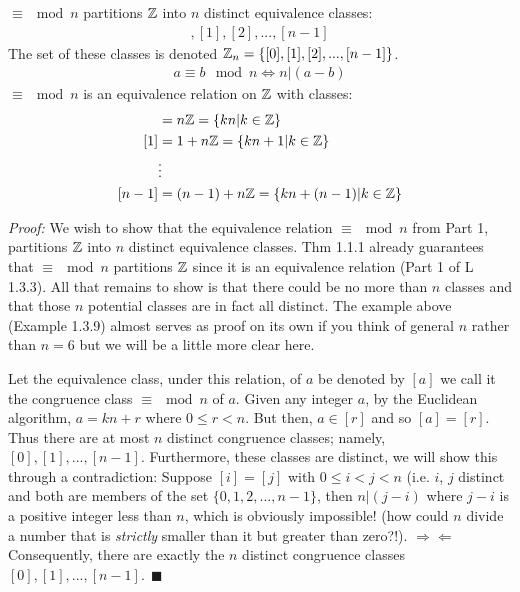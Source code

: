 \newpage
\setcounter{dummy_lemma}{2}
\begin{lemma}[Part 2]
$\equiv \mod n$ partitions ${\mathbb{Z}}$ into $n$ distinct equivalence classes:
\begin{align}
    [0],[1],[2],...,[n-1]\nonumber
\end{align}
The set of these classes is denoted ${\mathbb{Z}}_n=\{[0],[1],[2],...,[n-1]\}$.
\begin{align}
    a\equiv b\mod n \iff n|(a-b) \nonumber
\end{align}
$\equiv \mod n$ is an equivalence relation on ${\mathbb{Z}}$ with classes:
\begin{align}
    [0]&= n\Z=\{kn|k\in \Z\} \nonumber\\
    [1]&= 1+n\Z=\{kn+1|k\in \Z\} \nonumber\\
    &\vdots \nonumber \\
    [n-1]&= (n-1)+n\Z = \{kn+(n-1)|k\in \Z \} \nonumber
\end{align}

\textit{Proof:} We wish to show that the equivalence relation $\equiv\mod n$ from Part 1, partitions
${\mathbb{Z}}$ into $n$ distinct equivalence classes. Thm 1.1.1 already guarantees that $\equiv\mod n$
partitions ${\mathbb{Z}}$ since it is an equivalence relation (Part 1 of L 1.3.3). All that remains to show is
that there could be no more than $n$ classes and that those $n$ potential classes are in fact all
distinct. The example above (Example 1.3.9) almost serves as proof on its own if you think of
general $n$ rather than $n=6$ but we will be a little more clear here. \steezybreak

\noindent Let the equivalence class, under this relation, of $a$ be denoted by $[a]$
we call it the congruence class $\equiv\mod n$ of $a$. Given any integer $a$, by the
Euclidean algorithm, $a = kn + r$ where $0 \leq r < n$. But then, $a \in [r]$ and
so $[a] = [r]$. Thus there are at most $n$ distinct congruence classes; namely,
$[0], [1], ... , [n- 1]$. Furthermore, these classes are distinct, we will show this through a
contradiction: Suppose $[i] = [j]$ with $0 \leq i < j < n$ (i.e. $i$, $j$ distinct and both are
members of the set $\{0,1,2,...,n-1\}$, then $n | (j - i)$ where $j - i$ is a positive integer less
than $n$, which is obviously impossible! (how could $n$ divide a number that is \textit{strictly}
smaller than it but greater than zero?!). $\Rightarrow\Leftarrow$ Consequently, there are exactly
the $n$ distinct congruence classes $[0], [1], ... , [n - 1]. \ \ \blacksquare$
\end{lemma}

